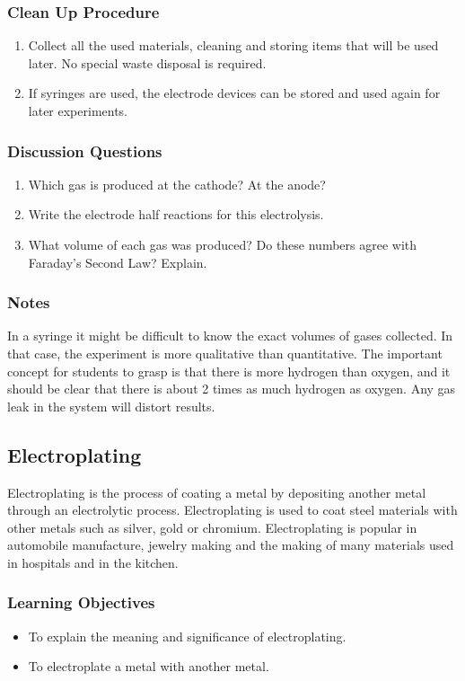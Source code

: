 \subsubsection*{Clean Up Procedure}
\begin{enumerate}
\item{Collect all the used materials, cleaning and storing items that will be used later. No special waste disposal is required.}
\item{If syringes are used, the electrode devices can be stored and used again for later experiments.}
\end{enumerate}

\subsubsection*{Discussion Questions}
\begin{enumerate}
\item{Which gas is produced at the cathode? At the anode?}
\item{Write the electrode half reactions for this electrolysis.}
\item{What volume of each gas was produced? Do these numbers agree with Faraday's Second Law? Explain.}
\end{enumerate}

\subsubsection*{Notes}
In a syringe it might be difficult to know the exact volumes of gases collected. In that case, the experiment is more qualitative than quantitative. The important concept for students to grasp is that there is more hydrogen than oxygen, and it should be clear that there is about 2 times as much hydrogen as oxygen.
Any gas leak in the system will distort results.

\subsection{Electroplating}

Electroplating is the process of coating a metal by depositing another metal through an electrolytic process. Electroplating is used to coat steel materials with other metals such as silver, gold or chromium. Electroplating is popular in automobile manufacture, jewelry making and the making of many materials used in hospitals and in the kitchen.

\subsubsection*{Learning Objectives}
\begin{itemize}
\item{To explain the meaning and significance of electroplating.}
\item{To electroplate a metal with another metal.}
\end{itemize}

